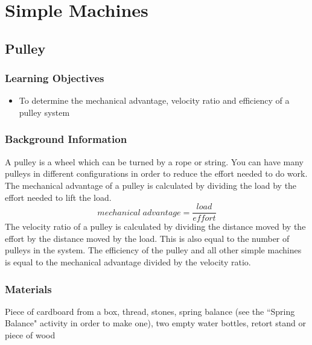 \section{Simple Machines}

\subsection{Pulley}

\subsubsection*{Learning Objectives}
\begin{itemize}
\item{To determine the mechanical advantage, velocity ratio and efficiency of a pulley system}
\end{itemize}

\subsubsection*{Background Information}
A pulley is a wheel which can be turned by a rope or string.  You can have many pulleys in different configurations in order to reduce the effort needed to do work.
The mechanical advantage of a pulley is calculated by dividing the load by the effort needed to lift the load.
$$mechanical\;advantage=\frac{load}{effort}$$
The velocity ratio of a pulley is calculated by dividing the distance moved by the effort by the distance moved by the load.  This is also equal to the number of pulleys in the system.
The efficiency of the pulley and all other simple machines is equal to the mechanical advantage divided by the velocity ratio.

\subsubsection*{Materials}
Piece of cardboard from a box, thread, stones, spring balance (see the ``Spring Balance" activity in order to make one), two empty water bottles, retort stand or piece of wood

